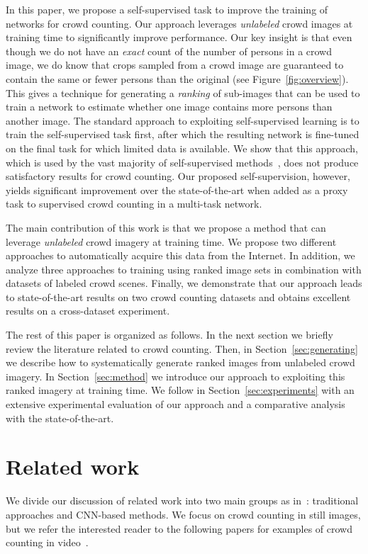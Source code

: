 \documentclass[10pt,twocolumn,letterpaper]{article}
\begin{document}
In this paper, we propose a self-supervised task to improve the
training of networks for crowd counting.  Our approach leverages
\emph{unlabeled} crowd images at training time to significantly
improve performance. Our key insight is that even though we do not
have an \emph{exact} count of the number of persons in a crowd image,
we do know that crops sampled from a crowd image are guaranteed to
contain the same or fewer persons than the original (see
Figure~\ref{fig:overview}). This gives a technique for generating a
\emph{ranking} of sub-images that can be used to train a network to
estimate whether one image contains more persons than another
image. The standard approach to exploiting self-supervised learning is
to train the self-supervised task first, after which the resulting
network is fine-tuned on the final task for which limited data is
available. We show that this approach, which is used by the vast
majority of self-supervised
methods~\cite{doersch2015unsupervised,liu2017rankiqa,noroozi2017representation,pathak2016context,zhang2016colorful},
does not produce satisfactory results for crowd
counting. Our proposed self-supervision, however, yields significant
improvement over the state-of-the-art when added as a proxy task to
supervised crowd counting in a multi-task network.


The main contribution of this work is that we propose a method that
can leverage \emph{unlabeled} crowd imagery at training time. We
propose two different approaches to automatically acquire this data
from the Internet. In addition, we analyze three approaches to
training using ranked image sets in combination with datasets of
labeled crowd scenes. Finally, we demonstrate that our approach leads
to state-of-the-art results on two crowd counting datasets and obtains
excellent results on a cross-dataset experiment.

The rest of this paper is organized as follows. In the next section we
briefly review the literature related to crowd counting. Then, in
Section~\ref{sec:generating} we describe how to systematically
generate ranked images from unlabeled crowd imagery. In
Section~\ref{sec:method} we introduce our approach to exploiting this
ranked imagery at training time. We follow in
Section~\ref{sec:experiments} with an extensive experimental
evaluation of our approach and a comparative analysis with the
state-of-the-art.

\section{Related work}
We divide our discussion of related work into two main groups as
in~\cite{sindagi2017survey}: traditional approaches and CNN-based
methods. We focus on crowd counting in still images, but we refer the
interested reader to the following papers for examples of
crowd counting in
video~\cite{chan2012counting,cong2009flow,ma2013crossing}.
\end{document}
